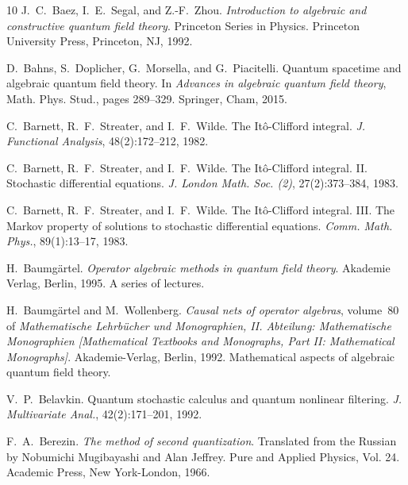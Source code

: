 \documentclass{article}
\newcommand{\tmtextit}[1]{{\itshape{#1}}}
\begin{document}
\begin{thebibliography}{10}
  J.~C.~Baez, I.~E.~Segal, and  Z.-F.~Zhou.
  {\newblock}\tmtextit{Introduction to algebraic and constructive quantum
  field theory}. {\newblock}Princeton Series in Physics. Princeton University
  Press, Princeton, NJ, 1992.{\newblock}
  
  D.~Bahns, S.~Doplicher, G.~Morsella, and 
  G.~Piacitelli. {\newblock}Quantum spacetime and algebraic quantum field
  theory. {\newblock}In \tmtextit{Advances in algebraic quantum field theory},
  Math. Phys. Stud.,  pages  289--329. Springer, Cham, 2015.{\newblock}
  
  C.~Barnett, R.~F.~Streater, and  I.~F.~Wilde.
  {\newblock}The It{\^o}-Clifford integral. {\newblock}\tmtextit{J. Functional
  Analysis}, 48(2):172--212, 1982.{\newblock}
  
  C.~Barnett, R.~F.~Streater, and  I.~F.~Wilde.
  {\newblock}The It{\^o}-Clifford integral. II. Stochastic differential
  equations. {\newblock}\tmtextit{J. London Math. Soc. (2)}, 27(2):373--384,
  1983.{\newblock}
  
  C.~Barnett, R.~F.~Streater, and  I.~F.~Wilde.
  {\newblock}The It{\^o}-Clifford integral. III. The Markov property of
  solutions to stochastic differential equations. {\newblock}\tmtextit{Comm.
  Math. Phys.}, 89(1):13--17, 1983.{\newblock}
  
  H.~Baumg{\"a}rtel. {\newblock}\tmtextit{Operator
  algebraic methods in quantum field theory}. {\newblock}Akademie Verlag,
  Berlin, 1995. {\newblock}A series of lectures.{\newblock}
  
  H.~Baumg{\"a}rtel  and  M.~Wollenberg.
  {\newblock}\tmtextit{Causal nets of operator algebras},  volume~80  of
  \tmtextit{Mathematische Lehrb{\"u}cher und Monographien, II. Abteilung:
  Mathematische Monographien [Mathematical Textbooks and Monographs, Part II:
  Mathematical Monographs]}. {\newblock}Akademie-Verlag, Berlin, 1992.
  {\newblock}Mathematical aspects of algebraic quantum field
  theory.{\newblock}
  
  V.~P.~Belavkin. {\newblock}Quantum stochastic calculus
  and quantum nonlinear filtering. {\newblock}\tmtextit{J. Multivariate
  Anal.}, 42(2):171--201, 1992.{\newblock}
  
  F.~A.~Berezin. {\newblock}\tmtextit{The method of
  second quantization}. {\newblock}Translated from the Russian by Nobumichi
  Mugibayashi and Alan Jeffrey. Pure and Applied Physics, Vol. 24. Academic
  Press, New York-London, 1966.{\newblock}
  

\end{thebibliography}
\end{document}
